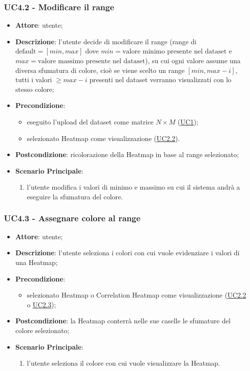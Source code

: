     \subsubsection{UC4.2 - Modificare il range}
    \label{uc4.2}
    \begin{itemize}
    \item \textbf{Attore}: utente;
    \item \textbf{Descrizione}: l'utente decide di modificare il range (range di $\textrm{default}=[min, max]$ dove $min=\textrm{valore minimo presente nel dataset}$ e $max=\textrm{valore massimo presente nel dataset}$), su cui ogni valore assume una diversa sfumatura di colore, cioè se viene scelto un range $[min, max-i]$, tutti i valori $\geq max-i$ presenti nel dataset verranno visualizzati con lo stesso colore;
    \item \textbf{Precondizione}: 
    \begin{itemize}
        \item eseguito l'upload del dataset come matrice $N\times M$ (\hyperref[uc1]{UC1});
        \item selezionato Heatmap come visualizzazione (\hyperref[uc2.2]{UC2.2}).
    \end{itemize}  
    \item \textbf{Postcondizione}: ricolorazione della Heatmap in base al range selezionato;
    \item \textbf{Scenario Principale}: 
    \begin{enumerate}
        \item l'utente modifica i valori di minimo e massimo su cui il sistema andrà a eseguire la sfumatura del colore.
    \end{enumerate}  
    \end{itemize}
    
     \subsubsection{UC4.3 - Assegnare colore al range}
    \label{uc4.3}
    
    \begin{itemize}
    \item \textbf{Attore}: utente;
    \item \textbf{Descrizione}: l'utente seleziona i colori con cui vuole evidenziare i valori di una Heatmap;
    \item \textbf{Precondizione}: 
    \begin{itemize}
        \item selezionato Heatmap o Correlation Heatmap come visualizzazione (\hyperref[uc2.2]{UC2.2} o \hyperref[uc2.3]{UC2.3});
    \end{itemize}  
    \item \textbf{Postcondizione}: la Heatmap conterrà nelle sue caselle le sfumature del colore selezionato;
    \item \textbf{Scenario Principale}: 
    \begin{enumerate}
        \item l'utente seleziona il colore con cui vuole visualizzare la Heatmap.
    \end{enumerate}  
    \end{itemize}

